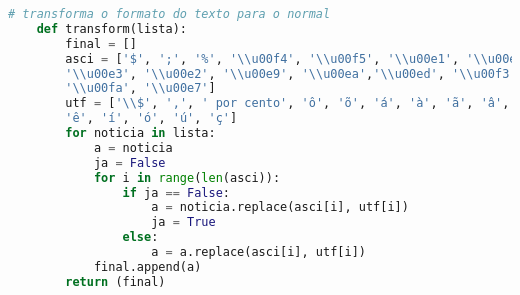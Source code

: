 \begin{lstlisting}[language=Python]
    # transforma o formato do texto para o normal
    def transform(lista):
        final = []
        asci = ['$', ';', '%', '\\u00f4', '\\u00f5', '\\u00e1', '\\u00e0',
        '\\u00e3', '\\u00e2', '\\u00e9', '\\u00ea','\\u00ed', '\\u00f3',
        '\\u00fa', '\\u00e7']
        utf = ['\\$', ',', ' por cento', 'ô', 'õ', 'á', 'à', 'ã', 'â', 'é',
        'ê', 'í', 'ó', 'ú', 'ç']
        for noticia in lista:
            a = noticia
            ja = False
            for i in range(len(asci)):
                if ja == False:
                    a = noticia.replace(asci[i], utf[i])
                    ja = True
                else:
                    a = a.replace(asci[i], utf[i])
            final.append(a)
        return (final)
        
\end{lstlisting}